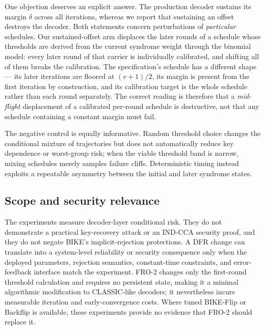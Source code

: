 \documentclass[lettersize,journal]{IEEEtran}
\begin{document}
One objection deserves an explicit answer. The production decoder sustains its margin $\delta$ across all iterations, whereas we report that sustaining an offset destroys the decoder. Both statements concern perturbations of \emph{particular} schedules. Our sustained-offset arm displaces the later rounds of a schedule whose thresholds are derived from the current syndrome weight through the binomial model: every later round of that carrier is individually calibrated, and shifting all of them breaks the calibration. The specification's schedule has a different shape --- its later iterations are floored at $(v{+}1)/2$, its margin is present from the first iteration by construction, and its calibration target is the whole schedule rather than each round separately. The correct reading is therefore that a \emph{mid-flight} displacement of a calibrated per-round schedule is destructive, not that any schedule containing a constant margin must fail.

The negative control is equally informative. Random threshold choice changes the conditional mixture of trajectories but does not automatically reduce key dependence or worst-group risk; when the viable threshold band is narrow, mixing schedules merely samples failure cliffs. Deterministic timing instead exploits a repeatable asymmetry between the initial and later syndrome states.

\subsection{Scope and security relevance}

The experiments measure decoder-layer conditional risk. They do not demonstrate a practical key-recovery attack or an IND-CCA security proof, and they do not negate BIKE's implicit-rejection protections. A DFR change can translate into a system-level reliability or security consequence only when the deployed parameters, rejection semantics, constant-time constraints, and error-feedback interface match the experiment. FRO-2 changes only the first-round threshold calculation and requires no persistent state, making it a minimal algorithmic modification to CLASSIC-like decoders; it nevertheless incurs measurable iteration and early-convergence costs. Where tuned BIKE-Flip or Backflip is available, these experiments provide no evidence that FRO-2 should replace it.
\end{document}
